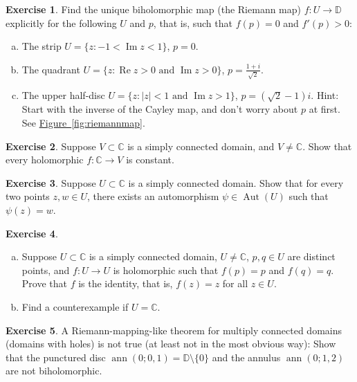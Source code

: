 \documentclass[12pt,openany]{book}
\newcommand{\ann}{\operatorname{ann}}
\renewcommand{\Re}{\operatorname{Re}}
\renewcommand{\Im}{\operatorname{Im}}
\newcommand{\Aut}{\operatorname{Aut}}
\newcommand{\sabs}[1]{\lvert {#1} \rvert}
\newcommand{\C}{{\mathbb{C}}}
\newcommand{\D}{{\mathbb{D}}}
\theoremstyle{plain}
\theoremstyle{remark}
\theoremstyle{definition}
\newenvironment{exbox}{%
    \def\FrameCommand{\vrule width 1pt \relax\hspace{10pt}}%
    \MakeFramed{\advance\hsize-\width\FrameRestore}%
}{%
    \endMakeFramed
}
\newenvironment{exparts}{%
    \leavevmode\begin{enumerate}[a),noitemsep,topsep=0pt,parsep=0pt,partopsep=0pt]
}{%
    \end{enumerate}
}
\theoremstyle{exercise}
\newtheorem{exercise}{Exercise}[section]
\theoremstyle{example}
\newcommand{\figureref}[1]{\hyperref[#1]{Figure~\ref*{#1}}}
\begin{document}
\begin{exbox}
\begin{exercise} \label{exercise:explicitriemann}
Find the unique biholomorphic map (the Riemann map)
$f \colon U \to \D$ explicitly
for the following $U$ and $p$, that is,
such that $f(p) = 0$ and $f'(p) > 0$:
\begin{exparts}
\item
The strip $U = \{ z : -1 < \Im z < 1 \}$, $p=0$.
\item
The quadrant $U = \{ z : \Re z > 0 \text{ and } \Im z > 0 \}$,
$p=\frac{1+i}{\sqrt{2}}$.
\item
The upper half-disc $U = \{ z : \sabs{z} < 1 \text{ and } \Im z > 1 \}$, $p
= (\sqrt{2}-1)i$.  Hint:  Start with the inverse of the Cayley map, and
don't worry about $p$ at first.  See \figureref{fig:riemannmap}.
\end{exparts}
\end{exercise}

\begin{exercise}
Suppose $V \subset \C$ is a simply connected domain, and $V \not= \C$.
Show that every holomorphic $f \colon \C \to V$ is constant.
\end{exercise}

\begin{exercise}
Suppose $U \subset \C$ is a simply connected domain.
Show that for every two points $z,w \in U$, there exists an automorphism
$\psi \in \Aut(U)$ such that $\psi(z) = w$.
\end{exercise}

\begin{exercise}
\begin{exparts}
\item
Suppose $U \subset \C$ is a simply connected domain, $U \not= \C$,
$p,q \in U$ are distinct points, and
$f \colon U \to U$ is holomorphic such that $f(p) = p$ and $f(q)=q$.
Prove that $f$ is the identity, that is, $f(z)=z$ for all $z \in U$.
\item
Find a counterexample if $U=\C$.
\end{exparts}
\end{exercise}

\begin{exercise}
A Riemann-mapping-like theorem for multiply connected domains (domains with
holes) is not true
(at least not in the most obvious way):
Show that the punctured disc $\ann(0;0,1) = \D \setminus \{ 0 \}$
and the annulus $\ann(0;1,2)$ are not biholomorphic.
\end{exercise}


\end{exbox}
\end{document}
